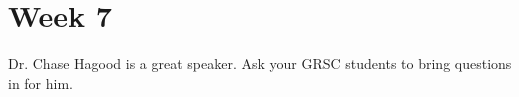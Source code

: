 
\section{Week 7}
\label{sec:week-7}

Dr. Chase Hagood is a great speaker.  Ask your GRSC students to bring questions in for him.

